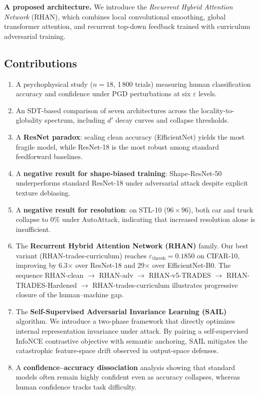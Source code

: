 \documentclass[12pt,a4paper]{article}
\begin{document}
\textbf{A proposed architecture.} We introduce the \textit{Recurrent
Hybrid Attention Network} (RHAN), which combines local convolutional
smoothing, global transformer attention, and recurrent top-down feedback
trained with curriculum adversarial training.

\subsection*{Contributions}

\begin{enumerate}[leftmargin=1.5em]
  \item A psychophysical study ($n{=}18$, 1\,800 trials) measuring human
        classification accuracy and confidence under PGD perturbations at
        six $\varepsilon$ levels.
  \item An SDT-based comparison of seven architectures across the
        locality-to-globality spectrum, including $d'$ decay curves and
        collapse thresholds.
  \item A \textbf{ResNet paradox}: scaling clean accuracy (EfficientNet)
        yields the most fragile model, while ResNet-18 is the most robust
        among standard feedforward baselines.
  \item A \textbf{negative result for shape-biased training}: Shape-ResNet-50
        underperforms standard ResNet-18 under adversarial attack despite
        explicit texture debiasing.
  \item A \textbf{negative result for resolution}: on STL-10 ($96{\times}96$),
        both car and truck collapse to 0\% under AutoAttack, indicating
        that increased resolution alone is insufficient.
  \item The \textbf{Recurrent Hybrid Attention Network (RHAN)} family. Our
        best variant (RHAN-trades-curriculum) reaches
        $\varepsilon_{\text{thresh}}{=}0.1850$ on CIFAR-10, improving by
        6.3$\times$ over ResNet-18 and 29$\times$ over EfficientNet-B0.
        The sequence RHAN-clean $\to$ RHAN-adv $\to$ RHAN-v5-TRADES $\to$
        RHAN-TRADES-Hardened $\to$ RHAN-trades-curriculum illustrates
        progressive closure of the human--machine gap.
  \item The \textbf{Self-Supervised Adversarial Invariance Learning (SAIL)} algorithm. We introduce a two-phase framework that directly optimizes internal representation invariance under attack. By pairing a self-supervised InfoNCE contrastive objective with semantic anchoring, SAIL mitigates the catastrophic feature-space drift observed in output-space defenses.
  \item A \textbf{confidence--accuracy dissociation} analysis showing that
        standard models often remain highly confident even as accuracy
        collapses, whereas human confidence tracks task difficulty.
\end{enumerate}
\end{document}

